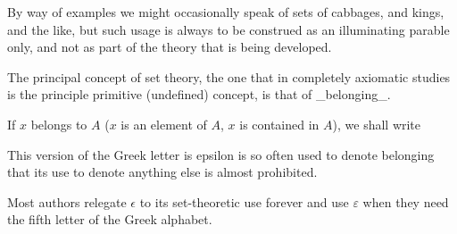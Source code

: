 By way of examples we might occasionally speak of sets of cabbages, and kings, and the like, but such usage is always to be construed as an illuminating parable only, and not as part of the theory that is being developed. 

The principal concept of set theory, the one that in completely axiomatic studies is the principle primitive (undefined) concept, is that of _belonging_. 

If {$x$} belongs to {$A$} ({$x$} is an element of {$A$}, {$x$} is contained in {$A$}), we shall write  

This version of the Greek letter is epsilon is so often used to denote belonging that its use to denote anything else is almost prohibited. 

Most authors relegate {$\epsilon$} to its set-theoretic use forever and use {$\varepsilon$} when they need the fifth letter of the Greek alphabet. 


